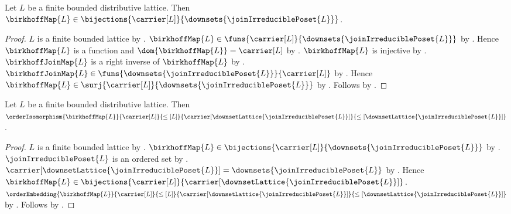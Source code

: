 \begin{theorem}\label{birkhoff_map_bijection}
    Let $L$ be a finite bounded distributive lattice.
    Then $\birkhoffMap{L}\in
        \bijections{\carrier[L]}
            {\downsets{\joinIrreduciblePoset{L}}}$.
\end{theorem}
\begin{proof}
    $L$ is a finite bounded lattice by .
    $\birkhoffMap{L}\in
        \funs{\carrier[L]}{\downsets{\joinIrreduciblePoset{L}}}$ by
        .
    Hence $\birkhoffMap{L}$ is a function and
        $\dom{\birkhoffMap{L}}=\carrier[L]$ by
        .
    $\birkhoffMap{L}$ is injective by .
    $\birkhoffJoinMap{L}$ is a right inverse of $\birkhoffMap{L}$ by
        .
    $\birkhoffJoinMap{L}\in
        \funs{\downsets{\joinIrreduciblePoset{L}}}{\carrier[L]}$ by
        .
    Hence $\birkhoffMap{L}\in
        \surj{\carrier[L]}{\downsets{\joinIrreduciblePoset{L}}}$ by
        .
    Follows by .
\end{proof}

\begin{theorem}\label{finite_birkhoff_order_isomorphism}
    Let $L$ be a finite bounded distributive lattice.
    Then
        $\orderIsomorphism
            {\birkhoffMap{L}}
            {\carrier[L]}{\leq[L]}
            {\carrier[\downsetLattice{\joinIrreduciblePoset{L}}]}
            {\leq[\downsetLattice{\joinIrreduciblePoset{L}}]}$.
\end{theorem}
\begin{proof}
    $L$ is a finite bounded lattice by .
    $\birkhoffMap{L}\in
        \bijections{\carrier[L]}
            {\downsets{\joinIrreduciblePoset{L}}}$ by
        .
    $\joinIrreduciblePoset{L}$ is an ordered set by
        .
    $\carrier[\downsetLattice{\joinIrreduciblePoset{L}}]
        =\downsets{\joinIrreduciblePoset{L}}$ by
        .
    Hence $\birkhoffMap{L}\in
        \bijections{\carrier[L]}
            {\carrier[\downsetLattice{\joinIrreduciblePoset{L}}]}$.
    $\orderEmbedding
        {\birkhoffMap{L}}
        {\carrier[L]}{\leq[L]}
        {\carrier[\downsetLattice{\joinIrreduciblePoset{L}}]}
        {\leq[\downsetLattice{\joinIrreduciblePoset{L}}]}$ by
        .
    Follows by .
\end{proof}

